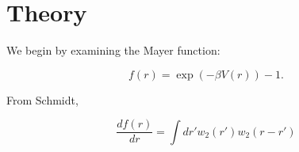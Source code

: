 \documentclass[letterpaper,twocolumn,amsmath,amssymb,prb]{revtex4-1}
\begin{document}
\section{Theory}

We begin by examining the Mayer function:

\begin{equation}
f(r) = \exp (-\beta V(r)) - 1.
\end{equation}

From Schmidt\cite{schmidt2000fluid},

\begin{equation}\label{eq:mayerandw2}
\frac{d f(r)}{dr} = \int dr' w_2(r') w_2 (r-r')
\end{equation}


\end{document}
